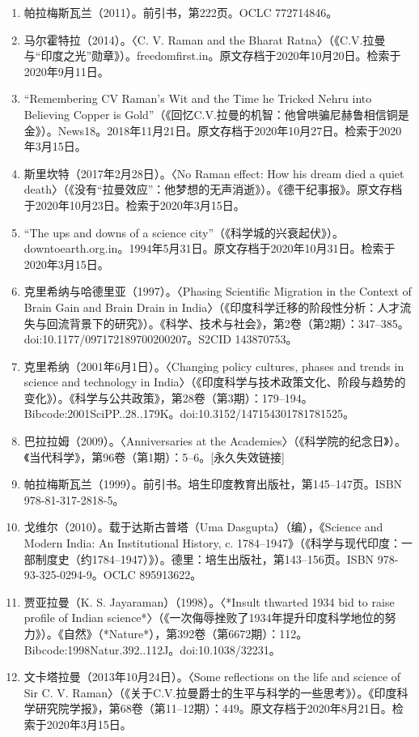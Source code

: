 \begin{enumerate}
\item 帕拉梅斯瓦兰（2011）。前引书，第222页。OCLC 772714846。
\item 马尔霍特拉（2014）。〈C. V. Raman and the Bharat Ratna〉（《C.V.拉曼与“印度之光”勋章》）。freedomfirst.in。原文存档于2020年10月20日。检索于2020年9月11日。
\item “Remembering CV Raman's Wit and the Time he Tricked Nehru into Believing Copper is Gold”（《回忆C.V.拉曼的机智：他曾哄骗尼赫鲁相信铜是金》）。News18。2018年11月21日。原文存档于2020年10月27日。检索于2020年3月15日。
\item 斯里坎特（2017年2月28日）。〈No Raman effect: How his dream died a quiet death〉（《没有“拉曼效应”：他梦想的无声消逝》）。《德干纪事报》。原文存档于2020年10月23日。检索于2020年3月15日。
\item “The ups and downs of a science city”（《科学城的兴衰起伏》）。downtoearth.org.in。1994年5月31日。原文存档于2020年10月31日。检索于2020年3月15日。
\item 克里希纳与哈德里亚（1997）。〈Phasing Scientific Migration in the Context of Brain Gain and Brain Drain in India〉（《印度科学迁移的阶段性分析：人才流失与回流背景下的研究》）。《科学、技术与社会》，第2卷（第2期）：347–385。doi:10.1177/097172189700200207。S2CID 143870753。
\item 克里希纳（2001年6月1日）。〈Changing policy cultures, phases and trends in science and technology in India〉（《印度科学与技术政策文化、阶段与趋势的变化》）。《科学与公共政策》，第28卷（第3期）：179–194。Bibcode:2001SciPP..28..179K。doi:10.3152/147154301781781525。
\item 巴拉拉姆（2009）。〈Anniversaries at the Academies〉（《科学院的纪念日》）。《当代科学》，第96卷（第1期）：5–6。[永久失效链接]
\item 帕拉梅斯瓦兰（1999）。前引书。培生印度教育出版社，第145–147页。ISBN 978-81-317-2818-5。
\item 戈维尔（2010）。载于达斯古普塔（Uma Dasgupta）（编），《Science and Modern India: An Institutional History, c. 1784–1947》（《科学与现代印度：一部制度史（约1784–1947）》）。德里：培生出版社，第143–156页。ISBN 978-93-325-0294-9。OCLC 895913622。
\item 贾亚拉曼（K. S. Jayaraman）（1998）。〈*Insult thwarted 1934 bid to raise profile of Indian science*〉（《一次侮辱挫败了1934年提升印度科学地位的努力》）。《自然》（*Nature*），第392卷（第6672期）：112。Bibcode:1998Natur.392..112J。doi:10.1038/32231。
\item 文卡塔拉曼（2013年10月24日）。〈Some reflections on the life and science of Sir C. V. Raman〉（《关于C.V.拉曼爵士的生平与科学的一些思考》）。《印度科学研究院学报》，第68卷（第11–12期）：449。原文存档于2020年8月21日。检索于2020年3月15日。

\end{enumerate}
